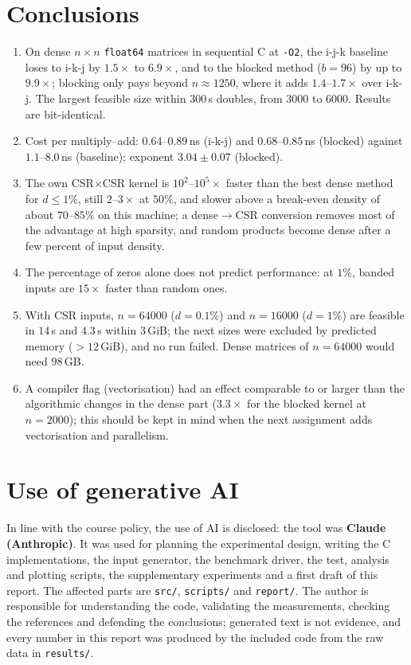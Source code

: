 \section{Conclusions}
\begin{enumerate}
  \item On dense $n\times n$ \texttt{float64} matrices in sequential C at \texttt{-O2}, the i-j-k baseline loses to i-k-j by $1.5\times$ to $6.9\times$, and to the blocked method ($b=96$) by up to $9.9\times$; blocking only pays beyond $n\approx1250$, where it adds $1.4$--$1.7\times$ over i-k-j. The largest feasible size within $300$\,s doubles, from $3000$ to $6000$. Results are bit-identical.
  \item Cost per multiply--add: $0.64$--$0.89$\,ns (i-k-j) and $0.68$--$0.85$\,ns (blocked) against $1.1$--$8.0$\,ns (baseline); exponent $3.04\pm0.07$ (blocked).
  \item The own CSR$\times$CSR kernel is $10^2$--$10^5\times$ faster than the best dense method for $d\le1\%$, still $2$--$3\times$ at $50\%$, and slower above a break-even density of about $70$--$85\%$ on this machine; a dense$\to$CSR conversion removes most of the advantage at high sparsity, and random products become dense after a few percent of input density.
  \item The percentage of zeros alone does not predict performance: at $1\%$, banded inputs are $15\times$ faster than random ones.
  \item With CSR inputs, $n=64000$ ($d=0.1\%$) and $n=16000$ ($d=1\%$) are feasible in $14$\,s and $4.3$\,s within $3$\,GiB; the next sizes were excluded by predicted memory ($>12$\,GiB), and no run failed. Dense matrices of $n=64000$ would need $98$\,GB.
  \item A compiler flag (vectorisation) had an effect comparable to or larger than the algorithmic changes in the dense part ($3.3\times$ for the blocked kernel at $n=2000$); this should be kept in mind when the next assignment adds vectorisation and parallelism.
\end{enumerate}

\section{Use of generative AI}
In line with the course policy, the use of AI is disclosed: the tool was \textbf{Claude (Anthropic)}. It was used for planning the experimental design, writing the C implementations, the input generator, the benchmark driver, the test, analysis and plotting scripts, the supplementary experiments and a first draft of this report.
The affected parts are \texttt{src/}, \texttt{scripts/} and \texttt{report/}. The author is responsible for understanding the code, validating the measurements, checking the references and defending the conclusions; generated text is not evidence, and every number in this report was produced by the included code
from the raw data in \texttt{results/}.

